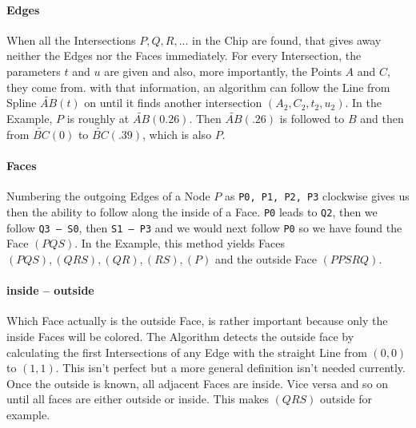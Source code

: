 \paragraph{Edges}
    When all the Intersections $P, Q, R, ...$ in the Chip are found, that gives away neither the Edges nor the Faces immediately. For every Intersection, the parameters $t$ and $u$ are given and also, more importantly, the Points $A$ and $C$, they come from. with that information, an algorithm can follow the Line from Spline $\widetilde{AB}(t)$ on until it finds another intersection $(A_2, C_2, t_2, u_2)$.
    In the Example, $P$ is roughly at $\widetilde{AB}(0.26)$. Then $\widetilde{AB}(.26)$ is followed to $B$ and then from $\widetilde{BC}(0)$ to $\widetilde{BC}(.39)$, which is also $P$.
\paragraph{Faces}
    Numbering the outgoing Edges of a Node $P$ as {\tt P0, P1, P2, P3} clockwise gives us then the ability to follow along the inside of a Face. {\tt P0} leads to {\tt Q2}, then we follow {\tt Q3 -- S0}, then {\tt S1 -- P3} and we would next follow {\tt P0} so we have found the Face $(PQS)$.
    In the Example, this method yields Faces $(PQS), (QRS), (QR), (RS), (P)$ and the outside Face $(PPSRQ)$.
\paragraph{inside – outside}
    Which Face actually is the outside Face, is rather important because only the inside Faces will be colored. The Algorithm detects the outside face by calculating the first Intersections of any Edge with the straight Line from $(0, 0)$ to $(1, 1)$. This isn't perfect but a more general definition isn't needed currently.
    Once the outside is known, all adjacent Faces are inside. Vice versa and so on until all faces are either outside or inside. This makes $(QRS)$ outside for example.

